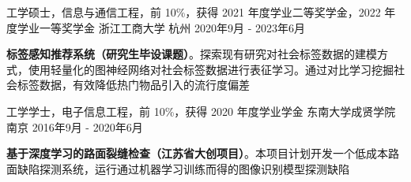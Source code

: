 

\begin{cventries}

  \cventry
    {工学硕士，信息与通信工程，前 10\%，获得 2021 年度学业二等奖学金，2022 年度学业一等奖学金} %
    {浙江工商大学} %
    {杭州} %
    {2020年9月 - 2023年6月} %
    {
      \begin{cvitems}
        \item \textbf{标签感知推荐系统（研究生毕设课题）}。探索现有研究对社会标签数据的建模方式，使用轻量化的图神经网络对社会标签数据进行表征学习。通过对比学习挖掘社会标签数据，有效降低热门物品引入的流行度偏差
      \end{cvitems}
    }

  \cventry
    {工学学士，电子信息工程，前 10\%，获得 2020 年度学业学金} %
    {东南大学成贤学院} %
    {南京} %
    {2016年9月 - 2020年6月} %
    {
      \begin{cvitems}
        \item \textbf{基于深度学习的路面裂缝检查（江苏省大创项目）}。本项目计划开发一个低成本路面缺陷探测系统，运行通过机器学习训练而得的图像识别模型探测缺陷
      \end{cvitems}
    }
\end{cventries}
